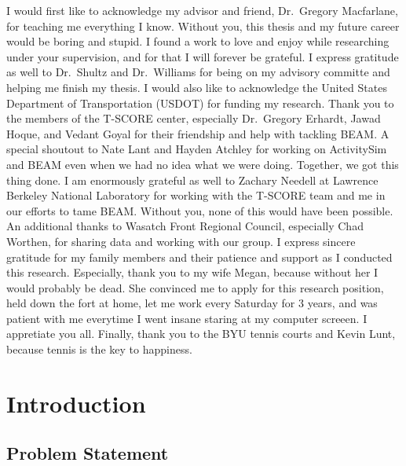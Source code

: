 \documentclass[fancy, masters]{byuthesis}
\begin{document}
    \begin{acknowledgments}
  I would first like to acknowledge my advisor and friend, Dr.~Gregory Macfarlane, for teaching me everything I know. Without you, this thesis and my future career would be boring and stupid. I found a work to love and enjoy while researching under your supervision, and for that I will forever be grateful. I express gratitude as well to Dr.~Shultz and Dr.~Williams for being on my advisory committe and helping me finish my thesis. I would also like to acknowledge the United States Department of Transportation (USDOT) for funding my research. Thank you to the members of the T-SCORE center, especially Dr.~Gregory Erhardt, Jawad Hoque, and Vedant Goyal for their friendship and help with tackling BEAM. A special shoutout to Nate Lant and Hayden Atchley for working on ActivitySim and BEAM even when we had no idea what we were doing. Together, we got this thing done. I am enormously grateful as well to Zachary Needell at Lawrence Berkeley National Laboratory for working with the T-SCORE team and me in our efforts to tame BEAM. Without you, none of this would have been possible. An additional thanks to Wasatch Front Regional Council, especially Chad Worthen, for sharing data and working with our group. I express sincere gratitude for my family members and their patience and support as I conducted this research. Especially, thank you to my wife Megan, because without her I would probably be dead. She convinced me to apply for this research position, held down the fort at home, let me work every Saturday for 3 years, and was patient with me everytime I went insane staring at my computer screeen. I appretiate you all. Finally, thank you to the BYU tennis courts and Kevin Lunt, because tennis is the key to happiness.
  \end{acknowledgments}
  	\clearpage

	\tableofcontents*
	\clearpage

	\listoffigures
	\clearpage

	\listoftables
	\clearpage

	
	\clearpage

	\mainmatter

\hypertarget{intro}{%
\chapter{Introduction}\label{intro}}

\hypertarget{problem-statement}{%
\section{Problem Statement}\label{problem-statement}}
\end{document}
